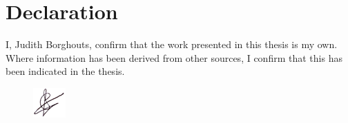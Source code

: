 \section*{Declaration}
I, Judith Borghouts, confirm that the work presented in this thesis is my own. Where information has been derived from other sources, I confirm that this has been indicated in the thesis.

\begin{figure}[!ht]
\begin{flushleft}
\includegraphics{images/signature.png}
\end{flushleft}
\end{figure}